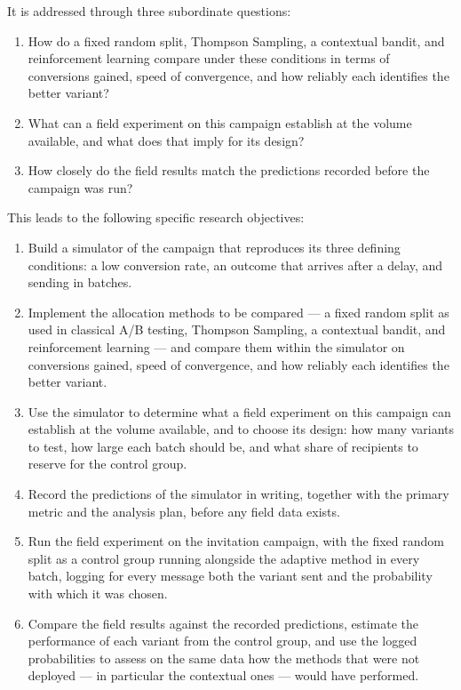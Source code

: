 \noindent It is addressed through three subordinate questions:

\begin{enumerate}
    \item How do a fixed random split, Thompson Sampling, a contextual bandit, and
    reinforcement learning compare under these conditions in terms of conversions
    gained, speed of convergence, and how reliably each identifies the better
    variant?
    \item What can a field experiment on this campaign establish at the volume
    available, and what does that imply for its design?
    \item How closely do the field results match the predictions recorded before
    the campaign was run?
\end{enumerate}

\vspace{0.5cm}

\noindent This leads to the following specific research objectives:

\begin{enumerate}
    \item Build a simulator of the campaign that reproduces its three defining conditions: a low conversion rate, an outcome that arrives after a delay, and sending in batches.
    \item Implement the allocation methods to be compared --- a fixed random split as used in classical A/B testing, Thompson Sampling, a contextual bandit, and reinforcement learning --- and compare them within the simulator on conversions gained, speed of convergence, and how reliably each identifies the better variant.
    \item Use the simulator to determine what a field experiment on this campaign can establish at the volume available, and to choose its design: how many variants to test, how large each batch should be, and what share of recipients to reserve for the control group.
    \item Record the predictions of the simulator in writing, together with the primary metric and the analysis plan, before any field data exists.
    \item Run the field experiment on the invitation campaign, with the fixed random split as a control group running alongside the adaptive method in every batch, logging for every message both the variant sent and the probability with which it was chosen.
    \item Compare the field results against the recorded predictions, estimate the performance of each variant from the control group, and use the logged probabilities to assess on the same data how the methods that were not deployed --- in particular the contextual ones --- would have performed.
\end{enumerate}
